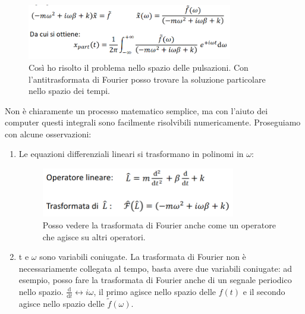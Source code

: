\begin{figure}[H]
	\centering
	\includegraphics[width=0.8\textwidth]{2024-03-07-09-48-28.png}
	\caption{Così ho risolto il problema nello spazio delle pulsazioni. Con l'antitrasformata di Fourier posso trovare la soluzione particolare nello spazio dei tempi.}
\end{figure}

Non è chiaramente un processo matematico semplice, ma con l'aiuto dei computer questi integrali sono facilmente risolvibili numericamente. Proseguiamo con alcune osservazioni:
\begin{enumerate}
	
	\item Le equazioni differenziali lineari si trasformano in polinomi in \(\omega \):
	\begin{figure}[H]
		\centering
		\includegraphics[width=0.8\textwidth]{2024-03-07-09-51-21.png}
		\caption{Posso vedere la trasformata di Fourier anche come un operatore che agisce su altri operatori.}
	\end{figure}
	
	\item t e \(\omega \) sono variabili coniugate. La trasformata di Fourier non è necessariamente collegata al tempo, basta avere due variabili coniugate: ad esempio, posso fare la trasformata di Fourier anche di un segnale periodico nello spazio. \(\frac{\mathrm{d}}{\mathrm{d}t} \leftrightarrow i \omega   \), il primo agisce nello spazio delle \(f(t)\) e il secondo agisce nello spazio delle \(\widetilde{f}(\omega ) \).  
\end{enumerate}

